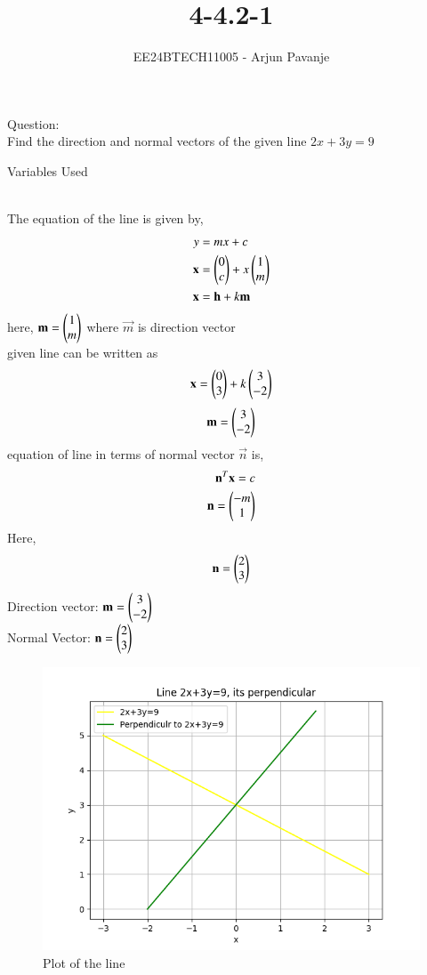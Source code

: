 \documentclass[journal]{IEEEtran}
\begin{document}

\vspace{3cm}

\title{4-4.2-1}
\author{EE24BTECH11005 - Arjun Pavanje}
{\let\newpage\relax\maketitle}
Question:\\
Find the direction and normal vectors of the given line $2x+3y=9$
\begin{table}[h!]    
  \centering
  
  \caption{Variables Used}
  \label{tab1-1.9-6}
\end{table}\\
\solution
The equation of the line is given by,
\begin{align}
	y&=mx+c\\
	\mathbf{x}&=\begin{pmatrix}0\\c\end{pmatrix}+ x \begin{pmatrix}1\\m\end{pmatrix}\\
	\mathbf{x}&=\mathbf{h}+k\mathbf{m}
\end{align}
here, $\mathbf{m}=\begin{pmatrix}1\\m\end{pmatrix}$ where $\vec{m}$ is direction vector\\
given line can be written as\\
$$\mathbf{x}=\begin{pmatrix}0\\3\end{pmatrix}+k\begin{pmatrix}3\\-2\end{pmatrix}$$
$$\mathbf{m}=\begin{pmatrix}3\\-2\end{pmatrix}$$
equation of line in terms of normal vector $\vec{n}$ is,
\begin{align}
\mathbf{n}^T\mathbf{x}=c\\
	\mathbf{n}=\begin{pmatrix}-m\\1\end{pmatrix}
\end{align}
Here, $$\mathbf{n}=\begin{pmatrix}2\\3\end{pmatrix}$$
Direction vector: $\mathbf{m}=\begin{pmatrix}3\\-2\end{pmatrix}$\\
Normal Vector: $\mathbf{n}=\begin{pmatrix}2\\3\end{pmatrix}$
\begin{figure}[h!]
   \centering
   \includegraphics[width = 1\linewidth]{figs/fig.png}
   \caption{Plot of the line}
   \label{stemplot}
\end{figure}
\end{document}
